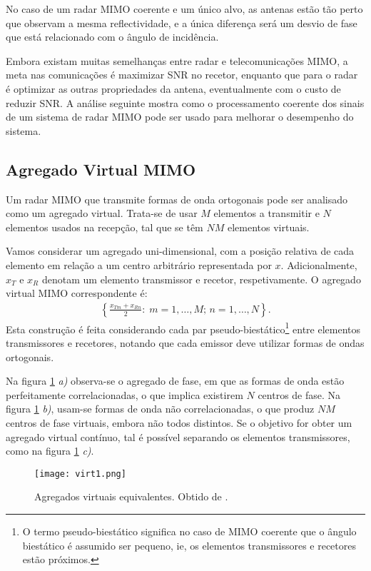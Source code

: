 \documentclass[purist,portuguese]{ist-report}
\begin{document}
No caso de um radar MIMO coerente e um único alvo, as antenas estão tão perto que observam a mesma reflectividade, e a única diferença será um desvio de fase que está relacionado com o ângulo de incidência.

Embora existam muitas semelhanças entre radar e telecomunicações MIMO, a meta nas comunicações é maximizar SNR no recetor, enquanto que para o radar é optimizar as outras propriedades da antena, eventualmente com o custo de reduzir SNR.
A análise seguinte mostra como o processamento coerente dos sinais de um sistema de radar MIMO pode ser usado para melhorar o desempenho do sistema.

\subsection{Agregado Virtual MIMO}

Um radar MIMO que transmite formas de onda ortogonais pode ser analisado como um agregado virtual.
Trata-se de usar $M$ elementos a transmitir e $N$ elementos usados na recepção, tal que se têm $NM$ elementos virtuais.

Vamos considerar um agregado uni-dimensional, com a posição relativa de cada elemento em relação a um centro arbitrário representada por $x$. 
Adicionalmente, $x_T$ e $x_R$ denotam um elemento transmissor e recetor, respetivamente.
O agregado virtual MIMO correspondente é:
\begin{align}
  \left\{ \frac{x_{Tm}+x_{Rn}}{2}:\; m=1,\ldots,M;\,n=1,\ldots,N \right\}.
  \label{eq:virtualmimo}
\end{align}
Esta construção é feita considerando cada par pseudo-biestático\footnote{O termo pseudo-biestático significa no caso de MIMO coerente que o ângulo biestático é assumido ser pequeno, ie, os elementos transmissores e recetores estão próximos.} entre elementos transmissores e recetores, notando que cada emissor deve utilizar formas de ondas ortogonais.

Na figura \ref{fig:virt1} \emph{a)} observa-se o agregado de fase, em que as formas de onda estão perfeitamente correlacionadas, o que implica existirem $N$ centros de fase.
Na figura \ref{fig:virt1} \emph{b)}, usam-se formas de onda não correlacionadas, o que produz $NM$ centros de fase virtuais, embora não todos distintos.
Se o objetivo for obter um agregado virtual contínuo, tal é possível separando os elementos transmissores, como na figura \ref{fig:virt1} \emph{c)}. 

\begin{figure}[h]
  \centering
  \texttt{[image: virt1.png]}
  \caption{Agregados virtuais equivalentes. Obtido de \cite{davis2015mimo}.}
  \label{fig:virt1}
\end{figure}
\end{document}
